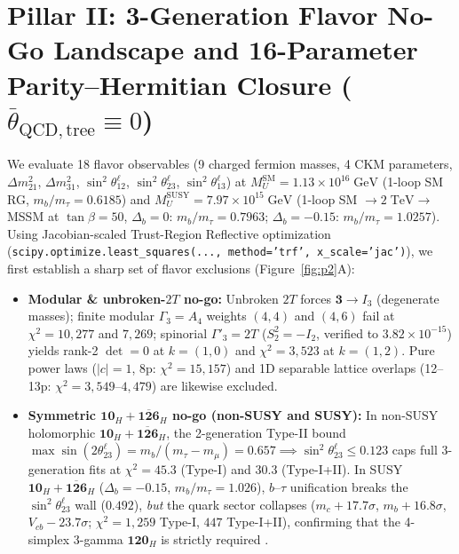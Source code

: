 \documentclass[11pt,a4paper]{article}
\begin{document}
\section{\texorpdfstring{Pillar II: 3-Generation Flavor No-Go Landscape and 16-Parameter Parity--Hermitian Closure ($\bar\theta_{\mathrm{QCD,tree}} \equiv 0$)}{Pillar II: 3-Generation Flavor No-Go Landscape and 16-Parameter Parity-Hermitian Closure}}
We evaluate 18 flavor observables (9 charged fermion masses, 4 CKM parameters, $\Delta m_{21}^2$, $\Delta m_{31}^2$, $\sin^2\theta_{12}^\ell$, $\sin^2\theta_{23}^\ell$, $\sin^2\theta_{13}^\ell$) at $M_U^{\mathrm{SM}} = 1.13\times 10^{16}\;\mathrm{GeV}$ (1-loop SM RG, $m_b/m_\tau = 0.6185$) and $M_U^{\mathrm{SUSY}} = 7.97\times 10^{15}\;\mathrm{GeV}$ (1-loop SM $\to 2\;\mathrm{TeV} \to$ MSSM at $\tan\beta = 50$, $\Delta_b = 0$: $m_b/m_\tau = 0.7963$; $\Delta_b = -0.15$: $m_b/m_\tau = 1.0257$). Using Jacobian-scaled Trust-Region Reflective optimization (\texttt{scipy.optimize.least\_squares(..., method='trf', x\_scale='jac')}), we first establish a sharp set of flavor exclusions (Figure~\ref{fig:p2}A):
\begin{itemize}
    \item \textbf{Modular \& unbroken-$2T$ no-go:} Unbroken $2T$ forces $\mathbf{3} \to I_3$ (degenerate masses); finite modular $\Gamma_3 = A_4$ weights $(4,4)$ and $(4,6)$ fail at $\chi^2 = 10{,}277$ and $7{,}269$; spinorial $\Gamma'_3 = 2T$ ($S_2^2 = -I_2$, verified to $3.82\times 10^{-15}$) yields rank-2 $\det = 0$ at $k=(1,0)$ and $\chi^2 = 3{,}523$ at $k=(1,2)$. Pure power laws ($|c|=1$, 8p: $\chi^2 = 15{,}157$) and 1D separable lattice overlaps (12--13p: $\chi^2 = 3{,}549\text{--}4{,}479$) are likewise excluded.
    \item \textbf{Symmetric $\mathbf{10}_H + \overline{\mathbf{126}}_H$ no-go (non-SUSY and SUSY):} In non-SUSY holomorphic $\mathbf{10}_H + \overline{\mathbf{126}}_H$, the 2-generation Type-II bound $\max\sin(2\theta_{23}^\ell) = m_b/(m_\tau - m_\mu) = 0.657 \implies \sin^2\theta_{23}^\ell \le 0.123$ caps full 3-generation fits at $\chi^2 = 45.3$ (Type-I) and $30.3$ (Type-I+II). In SUSY $\mathbf{10}_H + \overline{\mathbf{126}}_H$ ($\Delta_b = -0.15$, $m_b/m_\tau = 1.026$), $b$--$\tau$ unification breaks the $\sin^2\theta_{23}^\ell$ wall ($0.492$), \emph{but} the quark sector collapses ($m_c +17.7\sigma$, $m_b +16.8\sigma$, $V_{cb} -23.7\sigma$; $\chi^2 = 1{,}259$ Type-I, $447$ Type-I+II), confirming that the 4-simplex 3-gamma $\mathbf{120}_H$ is strictly required \cite{Bertolini2006}.
\end{itemize}
\end{document}
